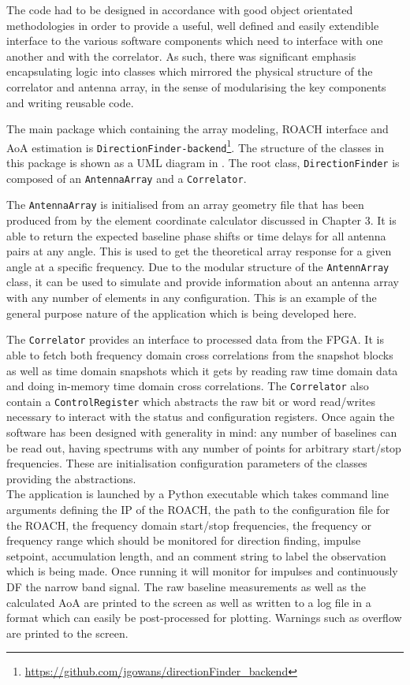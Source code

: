 The code had to be designed in accordance with good object orientated methodologies in order to provide a useful, well defined and easily extendible interface to the various software components which need to interface with one another and with the correlator. As such, there was significant emphasis encapsulating logic into classes which mirrored the physical structure of the correlator and antenna array, in the sense of modularising the key components and writing reusable code.

The main package which containing the array modeling, ROACH interface and AoA estimation is \lstinline{DirectionFinder-backend}\footnote{\url{https://github.com/jgowans/directionFinder_backend}}. The structure of the classes in this package is shown as a UML diagram in . The root class, \lstinline{DirectionFinder} is composed of an \lstinline{AntennaArray} and a \lstinline{Correlator}. 

The \lstinline{AntennaArray} is initialised from an array geometry file that has been produced from by the element coordinate calculator discussed in Chapter 3. It is able to return the expected baseline phase shifts or time delays for all antenna pairs at any angle. This is used to get the theoretical array response for a given angle at a specific frequency. Due to the modular structure of the \lstinline{AntennArray} class, it can be used to simulate and provide information about an antenna array with any number of elements in any configuration. This is an example of the general purpose nature of the application which is being developed here.

The \lstinline{Correlator} provides an interface to processed data from the FPGA. It is able to fetch both frequency domain cross correlations from the snapshot blocks as well as time domain snapshots which it gets by reading raw time domain data and doing in-memory time domain cross correlations. The \lstinline{Correlator} also contain a \lstinline{ControlRegister} which abstracts the raw bit or word read/writes necessary to interact with the status and configuration registers. Once again the software has been designed with generality in mind: any number of baselines can be read out, having spectrums with any number of points for arbitrary start/stop frequencies. These are initialisation configuration parameters of the classes providing the abstractions.\\

The application is launched by a Python executable which takes command line arguments defining the IP of the ROACH, the path to the configuration file for the ROACH, the frequency domain start/stop frequencies, the frequency or frequency range which should be monitored for direction finding, impulse setpoint, accumulation length, and an comment string to label the observation which is being made. Once running it will monitor for impulses and continuously DF the narrow band signal. The raw baseline measurements as well as the calculated AoA are printed to the screen as well as written to a log file in a format which can easily be post-processed for plotting. Warnings such as overflow are printed to the screen.\\

